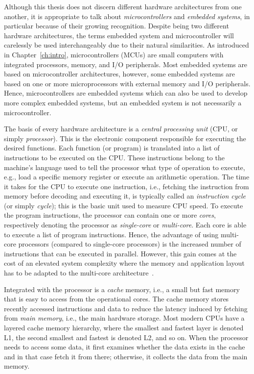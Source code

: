 Although this thesis does not discern different hardware architectures from one another, it is appropriate to talk about \emph{microcontrollers} and \emph{embedded systems}, in particular because of their growing recognition. 
Despite being two different hardware architectures, the terms embedded system and microcontroller will carelessly be used interchangeably due to their natural similarities.
As introduced in Chapter~\ref{ch:intro}, microcontrollers (MCUs) are small computers with integrated processors, memory, and I/O peripherals.
Most embedded systems are based on microcontroller architectures, however, some embedded systems are based on one or more microprocessors with external memory and I/O peripherals.
Hence, microcontrollers are embedded systems which can also be used to develop more complex embedded systems, but an embedded system is not necessarily a microcontroller.

The basis of every hardware architecture is a \emph{central processing unit} (CPU, or simply \emph{processor}).
This is the electronic component responsible for executing the desired functions.
Each function (or program) is translated into a list of instructions to be executed on the CPU.
These instructions belong to the machine's language used to tell the processor what type of operation to execute, e.g., load a specific memory register or execute an arithmetic operation.
The time it takes for the CPU to execute one instruction, i.e., fetching the instruction from memory before decoding and executing it, is typically called an \emph{instruction cycle} (or simply \emph{cycle}); this is the basic unit used to measure CPU speed.
To execute the program instructions, the processor can contain one or more \emph{cores}, respectively denoting the processor as \emph{single-core} or \emph{multi-core}.
Each core is able to execute a list of program instructions.
Hence, the advantage of using multi-core processors (compared to single-core processors) is the increased number of instructions that can be executed in parallel. 
However, this gain comes at the cost of an elevated system complexity where the memory and application layout has to be adapted to the multi-core architecture~\cite{Brandenburg:2011}.

Integrated with the processor is a \emph{cache} memory, i.e., a small but fast memory that is easy to access from the operational cores.
The cache memory stores recently accessed instructions and data to reduce the latency induced by fetching from \emph{main memory}, i.e., the main hardware storage.
Most modern CPUs have a layered cache memory hierarchy, where the smallest and fastest layer is denoted L1, the second smallest and fastest is denoted L2, and so on.
When the processor needs to access some data, it first examines whether the data exists in the cache and in that case fetch it from there; otherwise, it collects the data from the main memory.

